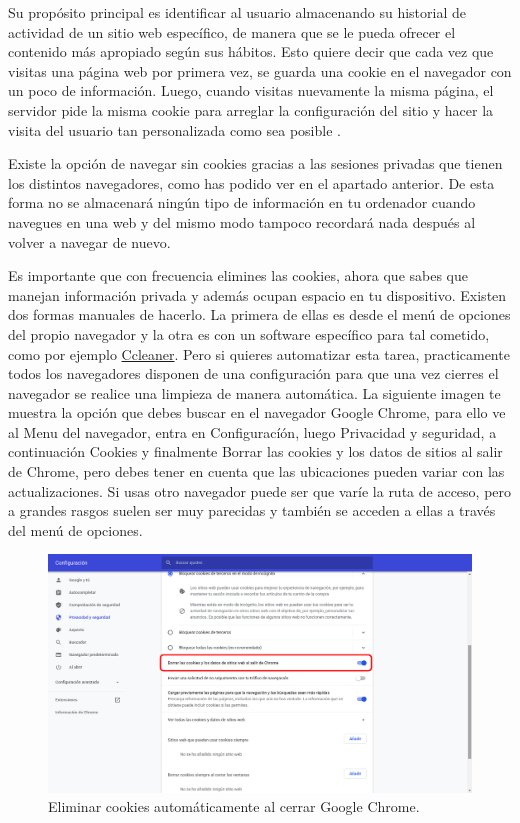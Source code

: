 \documentclass[
  spanish,
  a4paper,
  openany]{book}
\begin{document}
Su propósito principal es identificar al usuario almacenando su historial de actividad de un sitio web específico, de manera que se le pueda ofrecer el contenido más apropiado según sus hábitos. Esto quiere decir que cada vez que visitas una página web por primera vez, se guarda una cookie en el navegador con un poco de información. Luego, cuando visitas nuevamente la misma página, el servidor pide la misma cookie para arreglar la configuración del sitio y hacer la visita del usuario tan personalizada como sea posible \citep{cookies-navegador}.

Existe la opción de navegar sin cookies gracias a las sesiones privadas que tienen los distintos navegadores, como has podido ver en el apartado anterior. De esta forma no se almacenará ningún tipo de información en tu ordenador cuando navegues en una web y del mismo modo tampoco recordará nada después al volver a navegar de nuevo.

Es importante que con frecuencia elimines las cookies, ahora que sabes que manejan información privada y además ocupan espacio en tu dispositivo. Existen dos formas manuales de hacerlo. La primera de ellas es desde el menú de opciones del propio navegador y la otra es con un software específico para tal cometido, como por ejemplo \href{https://www.ccleaner.com/es-es}{Ccleaner}. Pero si quieres automatizar esta tarea, practicamente todos los navegadores disponen de una configuración para que una vez cierres el navegador se realice una limpieza de manera automática. La siguiente imagen te muestra la opción que debes buscar en el navegador Google Chrome, para ello ve al Menu del navegador, entra en Configuracíón, luego Privacidad y seguridad, a continuación Cookies y finalmente Borrar las cookies y los datos de sitios al salir de Chrome, pero debes tener en cuenta que las ubicaciones pueden variar con las actualizaciones. Si usas otro navegador puede ser que varíe la ruta de acceso, pero a grandes rasgos suelen ser muy parecidas y también se acceden a ellas a través del menú de opciones.

\begin{figure}

{\centering \includegraphics[width=0.75\linewidth]{images/borrado-cookies-cierre-navegador} 

}

\caption{Eliminar cookies automáticamente al cerrar Google Chrome.}\label{fig:unnamed-chunk-5}
\end{figure}
\end{document}

